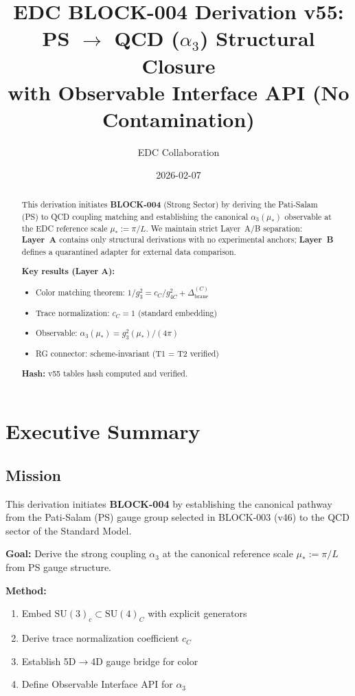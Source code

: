 \documentclass[11pt,a4paper]{article}
\title{%
  \textbf{EDC BLOCK-004 Derivation v55:}\\[0.5em]
  \Large PS $\to$ QCD ($\alpha_3$) Structural Closure\\[0.3em]
  \large with Observable Interface API (No Contamination)
}
\author{EDC Collaboration}
\date{2026-02-07}
\theoremstyle{definition}
\begin{document}
\maketitle

\begin{abstract}
This derivation initiates \textbf{BLOCK-004} (Strong Sector) by deriving the
Pati-Salam (PS) to QCD coupling matching and establishing the canonical
$\alpha_3(\mu_*)$ observable at the EDC reference scale $\mu_* := \pi/L$.
We maintain strict Layer~A/B separation: \textbf{Layer~A} contains only
structural derivations with no experimental anchors; \textbf{Layer~B} defines
a quarantined adapter for external data comparison.

\textbf{Key results (Layer A):}
\begin{itemize}
  \item Color matching theorem: $1/g_3^2 = c_C/g_{4C}^2 + \Delta_{\text{brane}}^{(C)}$
  \item Trace normalization: $c_C = 1$ (standard embedding)
  \item Observable: $\alpha_3(\mu_*) = g_3^2(\mu_*)/(4\pi)$
  \item RG connector: scheme-invariant (T1 = T2 verified)
\end{itemize}

\textbf{Hash:} v55 tables hash computed and verified.
\end{abstract}

\tableofcontents
\newpage

\section{Executive Summary}
\label{sec:executive}

\subsection{Mission}
\label{subsec:mission}

This derivation initiates \textbf{BLOCK-004} by establishing the canonical
pathway from the Pati-Salam (PS) gauge group selected in BLOCK-003 (v46) to
the QCD sector of the Standard Model.

\begin{canonbox}
\textbf{Goal:} Derive the strong coupling $\alpha_3$ at the canonical
reference scale $\mu_* := \pi/L$ from PS gauge structure.

\textbf{Method:}
\begin{enumerate}
  \item Embed $\text{SU}(3)_c \subset \text{SU}(4)_C$ with explicit generators
  \item Derive trace normalization coefficient $c_C$
  \item Establish 5D$\to$4D gauge bridge for color
  \item Define Observable Interface API for $\alpha_3$
\end{enumerate}
\end{canonbox}
\end{document}
